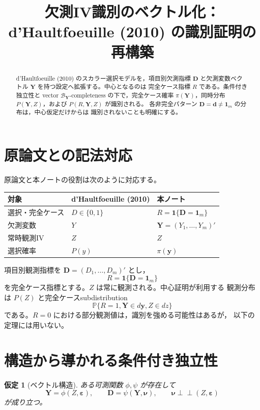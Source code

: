 \documentclass[11pt,a4paper]{article}
\title{欠測IV識別のベクトル化：\\
d'Haultfoeuille (2010) の識別証明の再構築}
\author{}
\date{}
\newtheorem{assumption}{仮定}
\newcommand{\Prb}{\mathbb P}
\newcommand{\1}{\mathbf 1}
\newcommand{\Y}{\bm Y}
\newcommand{\D}{\bm D}
\newcommand{\indep}{\mathrel{\perp\!\!\!\perp}}
\begin{document}
\maketitle

\begin{abstract}
d'Haultfoeuille (2010) のスカラー選択モデルを，項目別欠測指標
$\D$ と欠測変数ベクトル $\Y$ を持つ設定へ拡張する。中心となるのは
完全ケース指標 $R$ である。条件付き独立性と vector
$\mathcal B_{\Y}$-completeness の下で，完全ケース確率
$\pi(\Y)$，同時分布 $P(\Y,Z)$，および $P(R,\Y,Z)$ が識別される。
各非完全パターン $\D=\bm d\ne\bm 1_m$ の分布は，中心仮定だけからは
識別されないことも明確にする。
\end{abstract}

\section{原論文との記法対応}

原論文と本ノートの役割は次のように対応する。
\begin{center}
\begin{tabular}{lll}
\hline
対象 & d'Haultfoeuille (2010) & 本ノート \\
\hline
選択・完全ケース & $D\in\{0,1\}$ & $R=\1\{\D=\bm 1_m\}$ \\
欠測変数 & $Y$ & $\Y=(Y_1,\ldots,Y_m)'$ \\
常時観測IV & $Z$ & $Z$ \\
選択確率 & $P(y)$ & $\pi(\bm y)$ \\
\hline
\end{tabular}
\end{center}

項目別観測指標を $\D=(D_1,\ldots,D_m)'$ とし，
\begin{equation}
 R=\1\{\D=\bm 1_m\}
\end{equation}
を完全ケース指標とする。$Z$ は常に観測される。中心証明が利用する
観測分布は $P(Z)$ と完全ケースsubdistribution
\begin{equation}
 \Prb\{R=1,\Y\in d\bm y,Z\in dz\}
\end{equation}
である。$R=0$ における部分観測値は，識別を強める可能性はあるが，
以下の定理には用いない。

\section{構造から導かれる条件付き独立性}

\begin{assumption}[ベクトル構造]
ある可測関数 $\phi,\psi$ が存在して
\begin{equation}
 \Y=\phi(Z,\bm\varepsilon),
 \qquad
 \D=\psi(\Y,\bm\nu),
 \qquad
 \bm\nu\indep(Z,\bm\varepsilon)
 \label{eq:vector-structure}
\end{equation}
が成り立つ。
\end{assumption}
\end{document}
